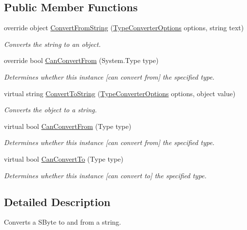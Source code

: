 \subsection*{Public Member Functions}
\begin{DoxyCompactItemize}
\item 
override object \hyperlink{a00145_ad16aeb03f418c89b3f78e95b46a46b40}{Convert\-From\-String} (\hyperlink{a00158}{Type\-Converter\-Options} options, string text)
\begin{DoxyCompactList}\small\item\em Converts the string to an object. \end{DoxyCompactList}\item 
override bool \hyperlink{a00145_a8f6d23460e0ddfe883cc06ded76bf633}{Can\-Convert\-From} (System.\-Type type)
\begin{DoxyCompactList}\small\item\em Determines whether this instance \mbox{[}can convert from\mbox{]} the specified type. \end{DoxyCompactList}\item 
virtual string \hyperlink{a00086_a36cb2f9b24f15a671293f3a722324c27}{Convert\-To\-String} (\hyperlink{a00158}{Type\-Converter\-Options} options, object value)
\begin{DoxyCompactList}\small\item\em Converts the object to a string. \end{DoxyCompactList}\item 
virtual bool \hyperlink{a00086_a470d21adaa704eb281250dbd112ff91a}{Can\-Convert\-From} (Type type)
\begin{DoxyCompactList}\small\item\em Determines whether this instance \mbox{[}can convert from\mbox{]} the specified type. \end{DoxyCompactList}\item 
virtual bool \hyperlink{a00086_acb65bd8c8199d88d5b1629ae35d18514}{Can\-Convert\-To} (Type type)
\begin{DoxyCompactList}\small\item\em Determines whether this instance \mbox{[}can convert to\mbox{]} the specified type. \end{DoxyCompactList}\end{DoxyCompactItemize}


\subsection{Detailed Description}
Converts a S\-Byte to and from a string. 



